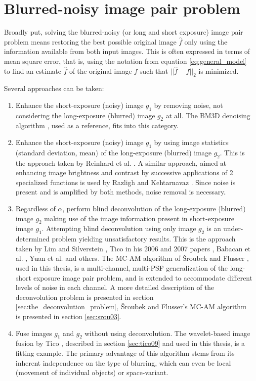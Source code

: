 \documentclass[12pt,notitlepage]{report}
\begin{document}
\section{Blurred-noisy image pair problem}
\label{sec:blurred_noisy}

Broadly put, solving the blurred-noisy (or long and short exposure) image pair problem means restoring the best possible original image $\hat{f}$ only using the information available from both input images. This is often expressed in terms of mean square error, that is, using the notation from equation \ref{eq:general_model} to find an estimate $\hat{f}$ of the original image $f$ such that $|| \hat{f} - f ||_2$ is minimized.

Several approaches can be taken:
\begin{enumerate}
	\item Enhance the short-exposure (noisy) image $g_1$ by removing noise, not considering the long-exposure (blurred) image $g_2$ at all. The BM3D denoising algorithm \cite{bm3d}, used as a reference, fits into this category.
	\item Enhance the short-exposure (noisy) image $g_1$ by using image statistics (standard deviation, mean) of the long-exposure (blurred) image $g_2$. This is the approach taken by Reinhard et al. \cite{rein01}. A similar approach, aimed at enhancing image brightness and contrast by successive applications of 2 specialized functions is used by Razligh and Kehtarnavaz \cite{razl07}. Since noise is present and is amplified by both methods, noise removal is necessary. 
	\item Regardless of $\alpha$, perform blind deconvolution of the long-exposure (blurred) image $g_2$ making use of the image information present in short-exposure image $g_1$. Attempting blind deconvolution using only image $g_2$ is an under-determined problem yielding unsatisfactory results. This is the approach taken by Lim and Silverstein \cite{lim08}, Tico in his 2006 and 2007 papers \cite{tico06} \cite{tico07},  Babacan et al. \cite{baba09}, Yuan et al. \cite{yuan07} and others. The MC-AM algorithm of Šroubek and Flusser \cite{srou03}, used in this thesis, is a multi-channel, multi-PSF generalization of the long-short exposure image pair problem, and is extended to accommodate different levels of noise in each channel. A more detailed description of the deconvolution problem is presented in section \ref{sec:the_deconvolution_problem}, Šroubek and Flusser's MC-AM algorithm is presented in section \ref{sec:srou03}.
	\item Fuse images $g_1$ and $g_2$ without using deconvolution. The wavelet-based image fusion by Tico \cite{tico09}, described in section \ref{sec:tico09} and used in this thesis, is a fitting example. The primary advantage of this algorithm stems from its inherent independence on the type of blurring, which can even be local (movement of individual objects) or space-variant.
\end{enumerate}  
\end{document}
